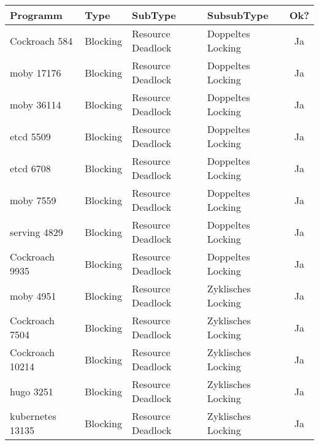 \newpage

\begin{longtable}[c]{|l|l|l|l|c|}
  \hline
  \textbf{Programm} & \textbf{Type} & \textbf{SubType}       & \textbf{SubsubType}    & \multicolumn{1}{l|}{\textbf{Ok?}} \\ \hline
  \endfirsthead
  \endhead
  Cockroach 584             & Blocking      & Resource Deadlock      & Doppeltes Locking      & Ja                                   \\ \hline
  moby 17176           & Blocking      & Resource Deadlock      & Doppeltes Locking      & Ja                                   \\ \hline
  moby 36114           & Blocking      & Resource Deadlock      & Doppeltes Locking      & Ja                                   \\ \hline
  etcd 5509            & Blocking      & Resource Deadlock      & Doppeltes Locking      & Ja                                   \\ \hline
  etcd 6708            & Blocking      & Resource Deadlock      & Doppeltes Locking      & Ja                                   \\ \hline
  moby 7559            & Blocking      & Resource Deadlock      & Doppeltes Locking      & Ja                                   \\ \hline
  serving 4829            & Blocking      & Resource Deadlock      & Doppeltes Locking      & Ja                                   \\ \hline
  Cockroach 9935            & Blocking      & Resource Deadlock      & Doppeltes Locking      & Ja                                   \\ \hline
  moby 4951            & Blocking      & Resource Deadlock      & Zyklisches Locking     & Ja                                   \\ \hline
  Cockroach 7504            & Blocking      & Resource Deadlock      & Zyklisches Locking     & Ja                                   \\ \hline
  Cockroach 10214           & Blocking      & Resource Deadlock      & Zyklisches Locking     & Ja                                   \\ \hline
  hugo 3251            & Blocking      & Resource Deadlock      & Zyklisches Locking     & Ja                                   \\ \hline
  kubernetes 13135           & Blocking      & Resource Deadlock      & Zyklisches Locking     & Ja                                   \\ \hline

\end{longtable}
